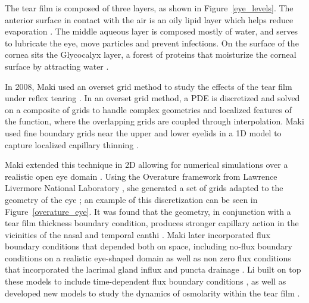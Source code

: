 	The tear film is composed of three layers, as shown in Figure~\ref{eye_levels}. The anterior surface in contact with the air is an oily lipid layer which helps reduce evaporation \cite{norn1979semiquantitative,mishima1961oily}. The middle aqueous layer is composed mostly of water, and serves to lubricate the eye, move particles and prevent infections. On the surface of the cornea sits the Glycocalyx layer, a forest of proteins that moisturize the corneal surface by attracting water \cite{gipson2004distribution}. 
	
 In 2008, Maki used an \textrm{overset grid} method to study the effects of the tear film under reflex tearing \cite{maki2008overset}. In an overset grid method, a PDE is discretized and solved on a composite of grids to handle complex geometries and localized features of the function, where the overlapping grids are coupled through interpolation. Maki used fine boundary grids near the upper and lower eyelids in a 1D model to capture localized capillary thinning \cite{maki2008overset}.
	
	Maki extended this technique in 2D allowing for numerical simulations over a realistic open eye domain \cite{maki2010tear,maki2010tear2}. Using the Overature framework from Lawrence Livermore National Laboratory \cite{chesshire1990composite,henshaw1998ogen}, she generated a set of grids adapted to the geometry of the eye \cite{chesshire1990composite}; an example of this discretization can be seen in Figure~\ref{overature_eye}. It was found that the geometry, in conjunction with a tear film thickness boundary condition, produces stronger capillary action in the vicinities of the nasal and temporal canthi \cite{maki2010tear}. Maki later incorporated flux boundary conditions that depended both on space, including no-flux boundary conditions on a realistic eye-shaped domain as well as non zero flux conditions that incorporated the lacrimal gland influx and puncta drainage \cite{maki2010tear2}. Li built on top these models to include time-dependent flux boundary conditions \cite{li2014tear}, as well as developed new models to study the dynamics of osmolarity within the tear film \cite{li2012model,li2016computed}.
	
